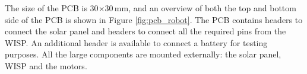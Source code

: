 The size of the PCB is 30$\times$30\,mm, and an overview of both the top and bottom side of the PCB is shown in Figure \ref{fig:pcb_robot}.
The PCB contains headers to connect the solar panel and headers to connect all the required pins from the WISP.
An additional header is available to connect a battery for testing purposes.
All the large components are mounted externally: the solar panel, WISP and the motors.


